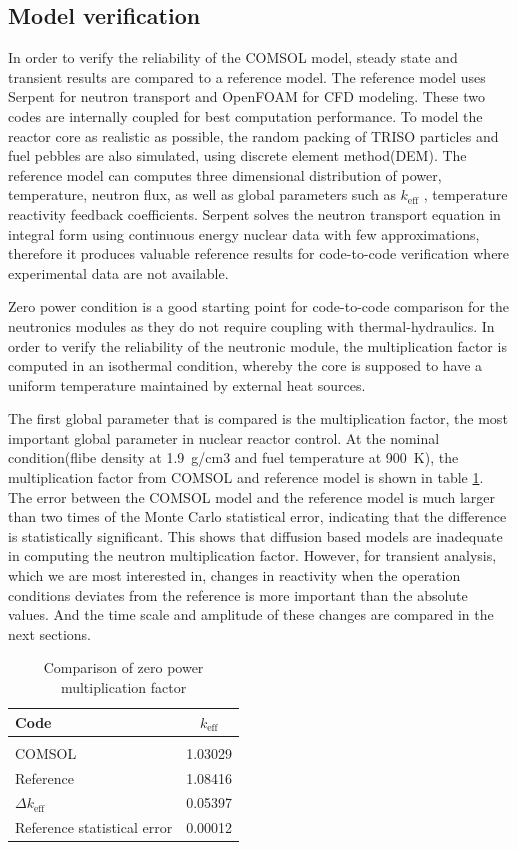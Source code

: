 \documentclass{elsarticle}
\newcommand{\keff}{{\ensuremath{k_{\mathrm{eff}}}} }
\begin{document}
\subsection{Model verification}
In order to verify the reliability of the COMSOL model, steady state and transient results are compared to a reference model. The reference model\cite{Aufiero2016} uses Serpent for neutron transport and OpenFOAM for CFD modeling. These two codes are internally coupled for best computation performance. To model the reactor core as realistic as possible, the random packing of TRISO particles and fuel pebbles are also simulated, using discrete element method(DEM). The reference model can computes three dimensional distribution of power, temperature, neutron flux, as well as global parameters such as \keff, temperature reactivity feedback coefficients. 
Serpent solves the neutron transport equation in integral form using continuous energy nuclear data with few approximations, therefore it produces valuable reference results for code-to-code verification where experimental data are not available. 


Zero power condition is a good starting point for code-to-code comparison for the neutronics modules as they do not require coupling with thermal-hydraulics. In order to verify the reliability of the neutronic module, the multiplication factor is computed in an isothermal condition, whereby the core is supposed to have a uniform temperature maintained by external heat sources.
 
The first global parameter that is compared is the multiplication factor, the most important global parameter in nuclear reactor control. 
At the nominal condition(flibe density at 1.9~g/cm3 and fuel temperature at 900~K), the multiplication factor from COMSOL and reference model is shown in table \ref{tab:keff}. The error between the COMSOL model and the reference model is much larger than two times of the Monte Carlo statistical error, indicating that the difference is statistically significant. This shows that diffusion based models are inadequate in computing the neutron multiplication factor. However, for transient analysis, which we are most interested in, changes in reactivity when the operation conditions deviates from the reference is more important than the absolute values.
And the time scale and amplitude of these changes are compared in the next sections.

\begin{table}
\centering
  \begin{tabular}{lc}
  \hline
        Code & \keff \\
        \hline\\
       COMSOL & 1.03029  \\
       Reference & 1.08416\\
       $\Delta$\keff & 0.05397\\
       Reference statistical error & 0.00012\\
       \hline
  \end{tabular}
  \caption{Comparison of zero power multiplication factor}
  \label{tab:keff}
\end{table}
\end{document}
